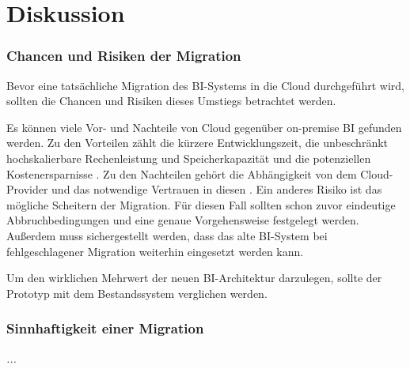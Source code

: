\chapter{Diskussion} \label{ch:diskussion}

\subsection{Chancen und Risiken der Migration} \label{sec:diskussion:chancenRisiken}
Bevor eine tatsächliche Migration des BI-Systems in die Cloud durchgeführt wird, sollten die Chancen und Risiken dieses Umstiegs betrachtet werden.

Es können viele Vor- und Nachteile von Cloud gegenüber on-premise BI gefunden werden. Zu den Vorteilen zählt die kürzere Entwicklungszeit, die unbeschränkt hochskalierbare Rechenleistung und Speicherkapazität und die potenziellen Kostenersparnisse \cite{ouf_cloud_2011}. Zu den Nachteilen gehört die Abhängigkeit von dem Cloud-Provider und das notwendige Vertrauen in diesen \cite{menon_business_2012}. Ein anderes Risiko ist das mögliche Scheitern der Migration. Für diesen Fall sollten schon zuvor eindeutige Abbruchbedingungen und eine genaue Vorgehensweise festgelegt werden. Außerdem muss sichergestellt werden, dass das alte BI-System bei fehlgeschlagener Migration weiterhin eingesetzt werden kann.

Um den wirklichen Mehrwert der neuen BI-Architektur darzulegen, sollte der Prototyp mit dem Bestandssystem verglichen werden.

\subsection{Sinnhaftigkeit einer Migration} \label{sec:diskussion:sinnhaftigkeit}
\textit{...}